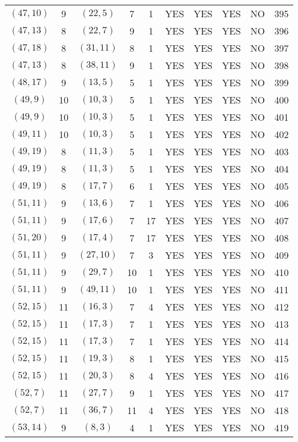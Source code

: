\begin{longtable}{|c|c|c|c|c|c|c|c|c|c|}
$(47, 10)$ & 9 & $(22, 5)$ & 7 & 1 & YES & YES & YES & NO & 395\\
$(47, 13)$ & 8 & $(22, 7)$ & 9 & 1 & YES & YES & YES & NO & 396\\
$(47, 18)$ & 8 & $(31, 11)$ & 8 & 1 & YES & YES & YES & NO & 397\\
$(47, 13)$ & 8 & $(38, 11)$ & 9 & 1 & YES & YES & YES & NO & 398\\
$(48, 17)$ & 9 & $(13, 5)$ & 5 & 1 & YES & YES & YES & NO & 399\\
$(49, 9)$ & 10 & $(10, 3)$ & 5 & 1 & YES & YES & YES & NO & 400\\
$(49, 9)$ & 10 & $(10, 3)$ & 5 & 1 & YES & YES & YES & NO & 401\\
$(49, 11)$ & 10 & $(10, 3)$ & 5 & 1 & YES & YES & YES & NO & 402\\
$(49, 19)$ & 8 & $(11, 3)$ & 5 & 1 & YES & YES & YES & NO & 403\\
$(49, 19)$ & 8 & $(11, 3)$ & 5 & 1 & YES & YES & YES & NO & 404\\
$(49, 19)$ & 8 & $(17, 7)$ & 6 & 1 & YES & YES & YES & NO & 405\\
$(51, 11)$ & 9 & $(13, 6)$ & 7 & 1 & YES & YES & YES & NO & 406\\
$(51, 11)$ & 9 & $(17, 6)$ & 7 & 17 & YES & YES & YES & NO & 407\\
$(51, 20)$ & 9 & $(17, 4)$ & 7 & 17 & YES & YES & YES & NO & 408\\
$(51, 11)$ & 9 & $(27, 10)$ & 7 & 3 & YES & YES & YES & NO & 409\\
$(51, 11)$ & 9 & $(29, 7)$ & 10 & 1 & YES & YES & YES & NO & 410\\
$(51, 11)$ & 9 & $(49, 11)$ & 10 & 1 & YES & YES & YES & NO & 411\\
$(52, 15)$ & 11 & $(16, 3)$ & 7 & 4 & YES & YES & YES & NO & 412\\
$(52, 15)$ & 11 & $(17, 3)$ & 7 & 1 & YES & YES & YES & NO & 413\\
$(52, 15)$ & 11 & $(17, 3)$ & 7 & 1 & YES & YES & YES & NO & 414\\
$(52, 15)$ & 11 & $(19, 3)$ & 8 & 1 & YES & YES & YES & NO & 415\\
$(52, 15)$ & 11 & $(20, 3)$ & 8 & 4 & YES & YES & YES & NO & 416\\
$(52, 7)$ & 11 & $(27, 7)$ & 9 & 1 & YES & YES & YES & NO & 417\\
$(52, 7)$ & 11 & $(36, 7)$ & 11 & 4 & YES & YES & YES & NO & 418\\
$(53, 14)$ & 9 & $(8, 3)$ & 4 & 1 & YES & YES & YES & NO & 419\\

\end{longtable}
